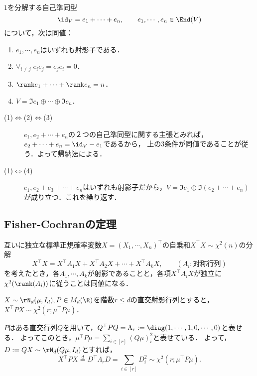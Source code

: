 \documentclass[uplatex,dvipdfmx]{jsarticle}
\begin{document}
\begin{proposition}[1を分解する射影子]\label{prop-projectors-decomposing-1}
    $1$を分解する自己準同型
    \[\id_V=e_1+\cdots+e_n,\qquad e_1,\cdots,e_n\in\End(V)\]
    について，次は同値：
    \begin{enumerate}
        \item $e_1,\cdots,e_n$はいずれも射影子である．
        \item $\forall_{i\ne j}\;e_ie_j=e_je_i=0$．
        \item $\rank e_1+\cdots+\rank e_n=n$．
        \item $V=\Im e_1\oplus\cdots\oplus\Im e_n$．
    \end{enumerate}
\end{proposition}
\begin{Proof}\mbox{}
    \begin{description}
        \item[(1)$\Leftrightarrow$(2)$\Leftrightarrow$(3)] $e_1,e_2+\cdots+e_n$の２つの自己準同型に関する主張とみれば，
        $e_2+\cdots+e_n=\id_V-e_1$であるから，
        上の3条件が同値であることが従う．よって帰納法による．
        \item[(1)$\Leftrightarrow$(4)] $e_1,e_2+e_3+\cdots+e_n$はいずれも射影子だから，$V=\Im e_1\oplus\Im(e_2+\cdots+e_n)$が成り立つ．これを繰り返す．
    \end{description}
\end{Proof}

\subsection{Fisher-Cochranの定理}

\begin{tcolorbox}[colframe=ForestGreen, colback=ForestGreen!10!white,breakable,colbacktitle=ForestGreen!40!white,coltitle=black,fonttitle=\bfseries\sffamily,
title=]
    互いに独立な標準正規確率変数$X=(X_1,\cdots,X_n)^\top$の自乗和$X^\top X\sim\chi^2(n)$の分解
    \[X^\top X=X^\top A_1X+X^\top A_2X+\cdots+X^\top A_kX,\qquad(A_i:\text{対称行列})\]
    を考えたとき，各$A_1,\cdots,A_k$が射影であることと，各項$X^\top A_iX$が独立に$\chi^2(\rank(A_i))$に従うことは同値になる．
\end{tcolorbox}

\begin{theorem}\label{thm-chi2-rv-from-normal-rv}
    $X\sim\rN_d(\mu,I_d),P\in M_d(\R)$を階数$r\le d$の直交射影行列とすると，$X^\top PX\sim\chi^2(r;\mu^\top P\mu)$．
\end{theorem}
\begin{Proof}
    $P$はある直交行列$Q$を用いて，$Q^\top PQ=\Lambda_r:=\diag(1,\cdots,1,0,\cdots,0)$と表せる．
    よってこのとき，$\mu^\top P\mu=\sum_{i\in[r]}(Q\mu)^2_i$と表せている．
    よって，$D:=QX\sim\rN_d(Q\mu,I_d)$とすれば，
    \[X^\top PX\overset{d}{=}D^\top\Lambda_rD=\sum_{i\in[r]}D_i^2\sim\chi^2(r;\mu^\top P\mu).\]
\end{Proof}
\end{document}
